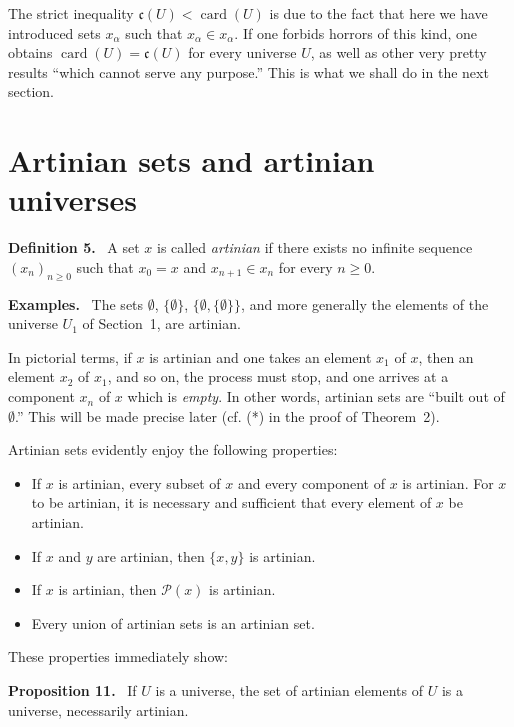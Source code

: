 \documentclass[11pt]{article}
\newcommand{\card}{\operatorname{card}}
\newcommand{\Pset}{\mathcal{P}}
\newcommand{\cf}{cf.}
\newenvironment{statement}[1]{\par\medskip\noindent\textbf{#1.}\ }{\par\medskip}
\newenvironment{remarktext}[1]{\par\medskip\noindent\textbf{#1.}\ }{\par\medskip}
\begin{document}
The strict inequality \(\mathfrak c(U)<\card(U)\) is due to the fact that here we have introduced sets \(x_\alpha\) such that \(x_\alpha\in x_\alpha\). If one forbids horrors of this kind, one obtains \(\card(U)=\mathfrak c(U)\) for every universe \(U\), as well as other very pretty results ``which cannot serve any purpose.'' This is what we shall do in the next section.

\section{Artinian sets and artinian universes}

\begin{statement}{Definition 5}
A set \(x\) is called \emph{artinian} if there exists no infinite sequence \((x_n)_{n\geq0}\) such that \(x_0=x\) and \(x_{n+1}\in x_n\) for every \(n\geq0\).
\end{statement}

\begin{remarktext}{Examples}
The sets \(\emptyset\), \(\{\emptyset\}\), \(\{\emptyset,\{\emptyset\}\}\), and more generally the elements of the universe \(U_1\) of Section~1, are artinian.
\end{remarktext}

In pictorial terms, if \(x\) is artinian and one takes an element \(x_1\) of \(x\), then an element \(x_2\) of \(x_1\), and so on, the process must stop, and one arrives at a component \(x_n\) of \(x\) which is \emph{empty}. In other words, artinian sets are ``built out of \(\emptyset\).'' This will be made precise later (\cf{} (*) in the proof of Theorem~2).

Artinian sets evidently enjoy the following properties:
\begin{itemize}[leftmargin=4em]
\item[(AR.I)] If \(x\) is artinian, every subset of \(x\) and every component of \(x\) is artinian. For \(x\) to be artinian, it is necessary and sufficient that every element of \(x\) be artinian.
\item[(AR.II)] If \(x\) and \(y\) are artinian, then \(\{x,y\}\) is artinian.
\item[(AR.III)] If \(x\) is artinian, then \(\Pset(x)\) is artinian.
\item[(AR.IV)] Every union of artinian sets is an artinian set.
\end{itemize}
These properties immediately show:

\begin{statement}{Proposition 11}
If \(U\) is a universe, the set of artinian elements of \(U\) is a universe, necessarily artinian.
\end{statement}
\end{document}
